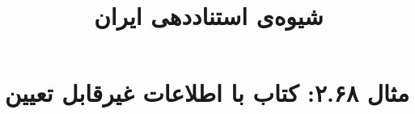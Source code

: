 \documentclass[a4paper,10pt]{article}
\begin{document}
\title{شیوه‌ی استناددهی ایران
 }
\author{}
\date{}
\maketitle



\section*{مثال ۲.۶۸: کتاب با اطلاعات غیرقابل تعیین}

\cite{نامشخص}\\
\cite{unknown}\\






\end{document}
